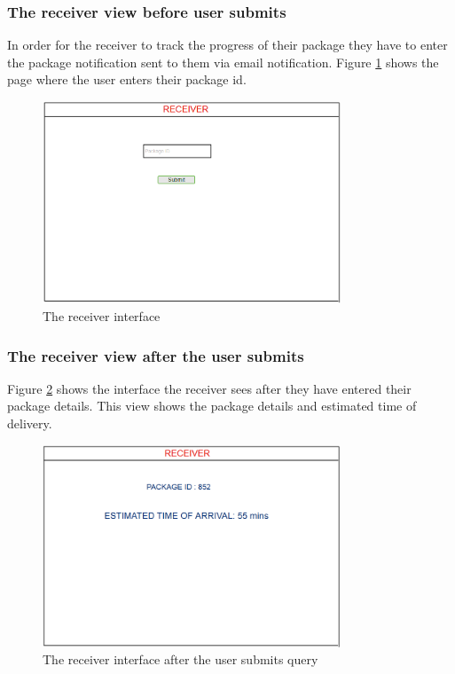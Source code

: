 \documentclass[paper=a4, fontsize=11pt]{scrartcl} %
\numberwithin{equation}{section} %
\numberwithin{figure}{section} %
\numberwithin{table}{section} %
\begin{document}
\subsubsection{The receiver view before user submits}
In order for the receiver to track the progress of their package they have to enter the package notification sent to them via email notification. Figure \ref{ReceiverBefore} shows the page where the user enters their package id.
\begin{figure}[h!]
\centering
\includegraphics[width=3.5in]{pictures/receiverBefore.png}
\caption{The receiver interface}
\label{ReceiverBefore}
\end{figure}

\subsubsection{The receiver view after the user submits}
Figure \ref{ReceiverAfter} shows the interface the receiver sees after they have entered their package details. This view shows the package details and estimated time of delivery.
\begin{figure}[h!]
\centering
\includegraphics[width=3.5in]{pictures/receiverAfter.png}
\caption{The receiver interface after the user submits query} 
\label{ReceiverAfter}
\end{figure}
\end{document}

